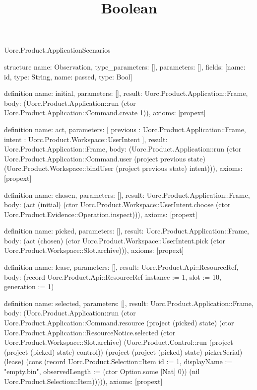 \begin{lexlean}{Uorc.Product.ApplicationScenarios}
\title{Boolean}
\begin{semanticmodule}
structure{
  name: Observation,
  type_parameters: [],
  parameters: [],
  fields: [{name: id, type: String}, {name: passed, type: Bool}]
}

definition{
  name: initial,
  parameters: [],
  result: Uorc.Product.Application::Frame,
  body: (Uorc.Product.Application::run (ctor Uorc.Product.Application::Command.create 1)),
  axioms: [propext]
}

definition{
  name: act,
  parameters: [
    previous : Uorc.Product.Application::Frame,
    intent : Uorc.Product.Workspace::UserIntent
  ],
  result: Uorc.Product.Application::Frame,
  body: (Uorc.Product.Application::run (ctor Uorc.Product.Application::Command.user (project previous state) (Uorc.Product.Workspace::bindUser (project previous state) intent))),
  axioms: [propext]
}

definition{
  name: chosen,
  parameters: [],
  result: Uorc.Product.Application::Frame,
  body: (act (initial) (ctor Uorc.Product.Workspace::UserIntent.choose (ctor Uorc.Product.Evidence::Operation.inspect))),
  axioms: [propext]
}

definition{
  name: picked,
  parameters: [],
  result: Uorc.Product.Application::Frame,
  body: (act (chosen) (ctor Uorc.Product.Workspace::UserIntent.pick (ctor Uorc.Product.Workspace::Slot.archive))),
  axioms: [propext]
}

definition{
  name: lease,
  parameters: [],
  result: Uorc.Product.Api::ResourceRef,
  body: (record Uorc.Product.Api::ResourceRef {instance := 1, slot := 10, generation := 1})
}

definition{
  name: selected,
  parameters: [],
  result: Uorc.Product.Application::Frame,
  body: (Uorc.Product.Application::run (ctor Uorc.Product.Application::Command.resource (project (picked) state) (ctor Uorc.Product.Application::ResourceNotice.selected (ctor Uorc.Product.Workspace::Slot.archive) (Uorc.Product.Control::run (project (project (picked) state) control)) (project (project (picked) state) pickerSerial) (lease) (cons (record Uorc.Product.Selection::Item {id := 1, displayName := "empty.bin", observedLength := (ctor Option.some [Nat] 0)}) (nil Uorc.Product.Selection::Item))))),
  axioms: [propext]
}


\end{semanticmodule}
\end{lexlean}
